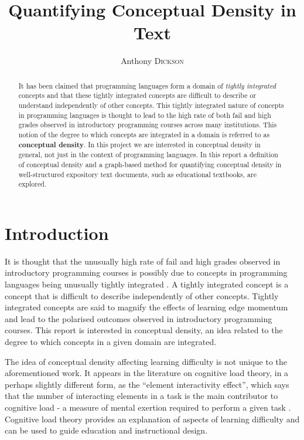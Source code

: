 \documentclass[12pt]{article}
\title{Quantifying Conceptual Density in Text}
\author{Anthony \textsc{Dickson}}
\theoremstyle{grammarstyle}
\begin{document}
\maketitle

\begin{abstract}
    It has been claimed that programming languages form a domain of \textit{tightly integrated} concepts and that these tightly integrated concepts are difficult to describe or understand independently of other concepts. This tightly integrated nature of concepts in programming languages is thought to lead to the high rate of both fail and high grades observed in introductory programming courses across many institutions. This notion of the degree to which concepts are integrated in a domain is referred to as \textbf{conceptual density}. In this project we are interested in conceptual density in general, not just in the context of programming languages. In this report a definition of conceptual density and a graph-based method for quantifying conceptual density in well-structured expository text documents, such as educational textbooks, are explored. 
\end{abstract}


\section{Introduction}
It is thought that the unusually high rate of fail and high grades observed in introductory programming courses is possibly due to concepts in programming languages being unusually tightly integrated \citep{robins2010learning}. A tightly integrated concept is a concept that is difficult to describe independently of other concepts. Tightly integrated concepts are said to magnify the effects of learning edge momentum and lead to the polarised outcomes observed in introductory programming courses. This report is interested in conceptual density, an idea related to the degree to which concepts in a given domain are integrated.  

The idea of conceptual density affecting learning difficulty is not unique to the aforementioned work. It appears in the literature on cognitive load theory, in a perhaps slightly different form, as the ``element interactivity effect'', which says that the number of interacting elements in a task is the main contributor to cognitive load - a measure of mental exertion required to perform a given task \citep{sweller1994cognitive}. Cognitive load theory provides an explanation of aspects of learning difficulty and can be used to guide education and instructional design.
\end{document}

